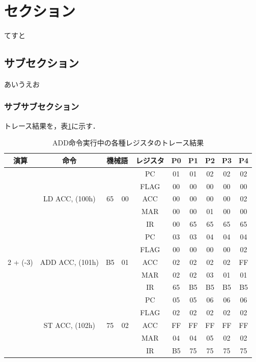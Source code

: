 


\section{セクション}
てすと
\subsection{サブセクション}
あいうえお
\subsubsection{サブサブセクション}
トレース結果を，表\ref{addtrace}に示す．

\begin{table}[htb]
\caption{ADD命令実行中の各種レジスタのトレース結果}
\begin{center}
\begin{tabular}
{c|c|c|c|c|c|c|c|c|c}
\hline
演算 & 命令 & \multicolumn{2}{c|}{機械語} & レジスタ & P0 & P1 & P2 & P3 & P4  \\ \hline

\multirow{15}{*}{2 + (-3)}&
\multirow{5}{*}{LD ACC, (100h)}&
\multirow{5}{*}{65} & \multirow{5}{*}{00} 
		& PC	& 01 & 01 & 02 & 02 & 02 \\
& & &	& FLAG	& 00 & 00 & 00 & 00 & 00 \\
& & &	& ACC	& 00 & 00 & 00 & 00 & 02 \\
& & &	& MAR	& 00 & 00 & 01 & 00 & 00 \\
& & &	& IR	& 00 & 65 & 65 & 65 & 65 \\
\cline{2-10}

&
\multirow{5}{*}{ADD ACC, (101h)}&
\multirow{5}{*}{B5} & \multirow{5}{*}{01} 
		& PC	& 03 & 03 & 04 & 04 & 04 \\
& & &	& FLAG	& 00 & 00 & 00 & 00 & 02 \\
& & &	& ACC	& 02 & 02 & 02 & 02 & FF \\
& & &	& MAR	& 02 & 02 & 03 & 01 & 01 \\
& & &	& IR	& 65 & B5 & B5 & B5 & B5 \\
\cline{2-10}

&
\multirow{5}{*}{ST ACC, (102h)}&
\multirow{5}{*}{75} & \multirow{5}{*}{02} 
		& PC	& 05 & 05 & 06 & 06 & 06 \\
& & &	& FLAG	& 02 & 02 & 02 & 02 & 02 \\
& & &	& ACC	& FF & FF & FF & FF & FF \\
& & &	& MAR	& 04 & 04 & 05 & 02 & 02 \\
& & &	& IR	& B5 & 75 & 75 & 75 & 75 \\
\hline

\end{tabular}
\end{center}
\label{addtrace}
\end{table}

